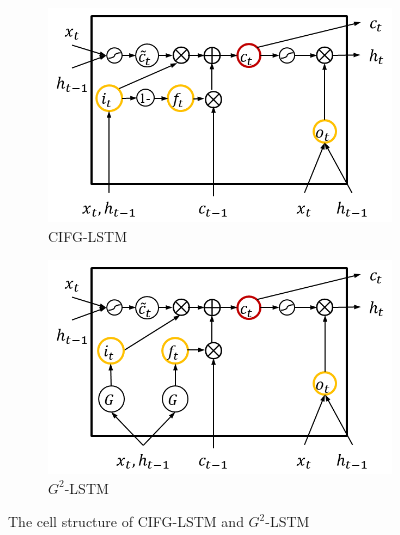 \documentclass[letterpaper]{article} %
\begin{document}
\begin{figure}[t!] %
	\centering
	\begin{subfigure}{.48\columnwidth}
		\centering
		\includegraphics[width=\linewidth]{CIFGLSTM_cell.png}
		\caption{CIFG-LSTM}
		\label{fig:CIFGLSTM_cell}
	\end{subfigure}\hfil
	\begin{subfigure}{.48\columnwidth}
		\centering
		\includegraphics[width=\linewidth]{G2LSTM_cell.png}
		\caption{$G^{2}$-LSTM}
		\label{fig:G2LSTM_cell}
	\end{subfigure}
	\caption{The cell structure of CIFG-LSTM and $G^{2}$-LSTM}
\end{figure}
\end{document}
